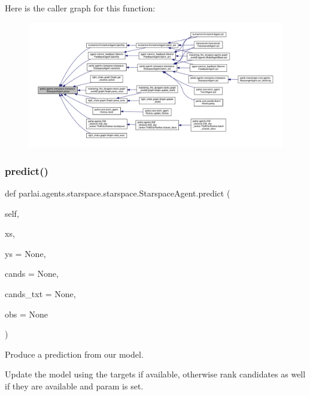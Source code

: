 Here is the caller graph for this function\+:
\nopagebreak
\begin{figure}[H]
\begin{center}
\leavevmode
\includegraphics[width=350pt]{classparlai_1_1agents_1_1starspace_1_1starspace_1_1StarspaceAgent_ab08bd065e56f11ebe2ad30d3894c46c7_icgraph}
\end{center}
\end{figure}
\mbox{\label{classparlai_1_1agents_1_1starspace_1_1starspace_1_1StarspaceAgent_a16753fa083c07bcdb8164116d8288b39}} 
\subsubsection{\texorpdfstring{predict()}{predict()}}
{\footnotesize\ttfamily def parlai.\+agents.\+starspace.\+starspace.\+Starspace\+Agent.\+predict (\begin{DoxyParamCaption}\item[{}]{self,  }\item[{}]{xs,  }\item[{}]{ys = {\ttfamily None},  }\item[{}]{cands = {\ttfamily None},  }\item[{}]{cands\+\_\+txt = {\ttfamily None},  }\item[{}]{obs = {\ttfamily None} }\end{DoxyParamCaption})}

\begin{DoxyVerb}Produce a prediction from our model.

Update the model using the targets if available, otherwise rank
candidates as well if they are available and param is set.
\end{DoxyVerb}
 

